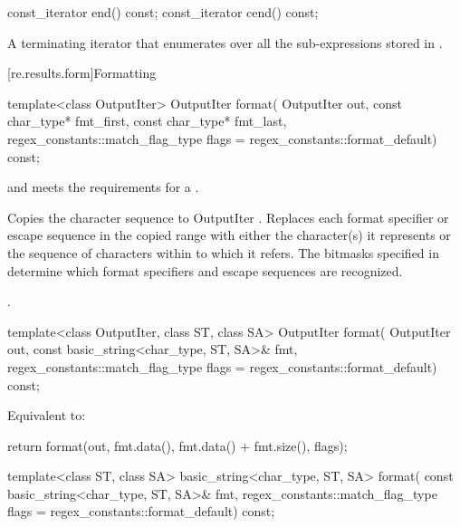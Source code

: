 %
\begin{itemdecl}
const_iterator end() const;
const_iterator cend() const;
\end{itemdecl}

\begin{itemdescr}
\pnum
\returns
A terminating iterator that enumerates over all the
sub-expressions stored in .
\end{itemdescr}

[re.results.form]{Formatting}

%
\begin{itemdecl}
template<class OutputIter>
  OutputIter format(
      OutputIter out,
      const char_type* fmt_first, const char_type* fmt_last,
      regex_constants::match_flag_type flags = regex_constants::format_default) const;
\end{itemdecl}

\begin{itemdescr}
\pnum
\expects
{} and  meets the requirements for a
.

\pnum
\effects
Copies the character sequence  to
OutputIter .  Replaces each format specifier or escape
sequence in the copied range with either the character(s) it represents or
the sequence of characters within  to which it refers.
The bitmasks specified in  determine which format
specifiers and escape sequences are recognized.

\pnum
\returns
{}.
\end{itemdescr}

%
\begin{itemdecl}
template<class OutputIter, class ST, class SA>
  OutputIter format(
      OutputIter out,
      const basic_string<char_type, ST, SA>& fmt,
      regex_constants::match_flag_type flags = regex_constants::format_default) const;
\end{itemdecl}

\begin{itemdescr}
\pnum
\effects
Equivalent to:
\begin{codeblock}
return format(out, fmt.data(), fmt.data() + fmt.size(), flags);
\end{codeblock}
\end{itemdescr}

%
\begin{itemdecl}
template<class ST, class SA>
  basic_string<char_type, ST, SA> format(
      const basic_string<char_type, ST, SA>& fmt,
      regex_constants::match_flag_type flags = regex_constants::format_default) const;
\end{itemdecl}

